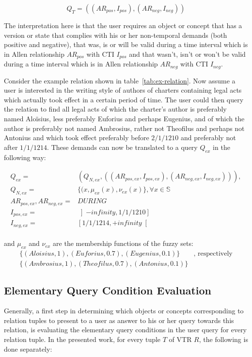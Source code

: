 \documentclass[runningheads,a4paper]{llncs}
\begin{document}
\begin{equation}
Q_T = ((AR_{pos}, I_{pos}), (AR_{neg}, I_{neg})) \nonumber
\end{equation}

The interpretation here is that the user requires an object or concept that has a version or state that complies with his or her non-temporal demands (both positive and negative), that was, is or will be valid during a time interval which is in Allen relationship $AR_{pos}$ with CTI $I_{pos}$ and that wasn't, isn't or won't be valid during a time interval which is in Allen relationship $AR_{neg}$ with CTI $I_{neg}$.

Consider the example relation shown in table~\ref{tab:ex-relation}. Now assume a user is interested in the writing style of authors of charters containing legal acts which actually took effect in a certain period of time. The user could then query the relation to find all legal acts of which the charter's author is preferably named Alo\"isius, less preferably Euforius and perhaps Eugenius, and of which the author is preferably not named Ambrosius, rather not Theofilus and perhaps not Antonius and which took effect preferably before $2/1/1210$ and preferably not after $1/1/1214$. These demands can now be translated to a query $Q_{ex}$ in the following way:

\vspace{-15pt}

\begin{align}
Q_{ex} = & (Q_{N,ex}, ((AR_{pos,ex}, I_{pos,ex}), (AR_{neg,ex}, I_{neg,ex}))), \\
Q_{N,ex} = & \{(x, \mu_{ex}(x), \nu_{ex}(x)\}, \forall x \in \mathbb{S} \nonumber \\
AR_{pos,ex}, AR_{neg,ex} = & DURING \nonumber \\
I_{pos,ex} = & \left]- infinity, 1/1/1210\right] \nonumber \\
I_{neg,ex} = & \left[1/1/1214, + infinity\right[ \nonumber
\end{align}
\\
and $\mu_{ex}$ and $\nu_{ex}$ are the membership functions of the fuzzy sets:
\begin{align}
\{(Aloisius, 1), (Euforius, 0.7), (Eugenius, 0.1)\} &\text{, respectively} \nonumber \\
\{(Ambrosius, 1), (Theofilus, 0.7), (Antonius, 0.1)\} & \nonumber
\end{align}


\subsection{Elementary Query Condition Evaluation}
Generally, a first step in determining which objects or concepts corresponding to relation tuples to present to a user as answer to his or her query towards this relation, is evaluating the elementary query conditions in the user query for every relation tuple. In the presented work, for every tuple $T$ of VTR $R$, the following is done separately:
\end{document}
